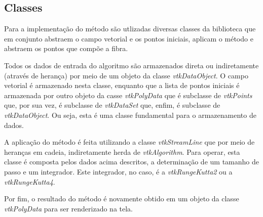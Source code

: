  \subsection{Classes}
  \label{classes-vtk}
  Para a implementação do método são utlizadas diversas classes da biblioteca que em conjunto abstraem o campo vetorial e os pontos iniciais, aplicam o método e abstraem os pontos que compõe a fibra.

  Todos os dados de entrada do algoritmo são armazenados direta ou indiretamente (através de herança) por meio de um objeto da classe \textit{vtkDataObject}. O campo vetorial é armazenado nesta classe, enquanto que a lista de pontos iniciais é armazenada por outro objeto da casse \textit{vtkPolyData} que é subclasse de \textit{vtkPoints} que, por sua vez, é subclasse de \textit{vtkDataSet} que, enfim, é subclasse de \textit{vtkDataObject}. Ou seja, esta é uma classe fundamental para o armazenamento de dados.

  A aplicação do método é feita utilizando a classe \textit{vtkStreamLine} que por meio de heranças em cadeia, indiretamente herda de \textit{vtkAlgorithm}. Para operar, esta classe é composta pelos dados acima descritos, a determinação de um tamanho de passo e um integrador. Este integrador, no caso, é a \textit{vtkRungeKutta2} ou a \textit{vtkRungeKutta4}.

  Por fim, o resultado do método é novamente obtido em um objeto da classe \textit{vtkPolyData} para ser renderizado na tela.
